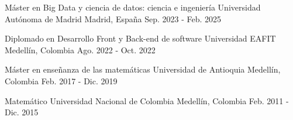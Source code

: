 
\begin{cventries}

\cventry
{Máster en Big Data y ciencia de datos: ciencia e ingeniería}
{Universidad Autónoma de Madrid}
{Madrid, España}
{Sep. 2023 - Feb. 2025}
{}

\cventry
{Diplomado en Desarrollo Front y Back-end de software}
{Universidad EAFIT}
{Medellín, Colombia}
{Ago. 2022 - Oct. 2022}
{}

\cventry
{Máster en enseñanza de las matemáticas}
{Universidad de Antioquia}
{Medellín, Colombia}
{Feb. 2017 - Dic. 2019}
{}

\cventry
{Matemático}
{Universidad Nacional de Colombia}
{Medellín, Colombia}
{Feb. 2011 - Dic. 2015}
{}

\end{cventries}
